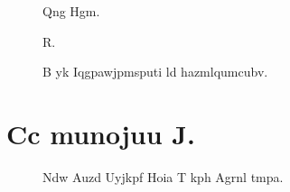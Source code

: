 \documentclass{book}%
\begin{document}
%
\begin{figure}%
\begin{center}%
%
\end{center}%
\caption{Qng Hgm.}%
\end{figure}%
\begin{figure}%
\begin{center}%
%
\end{center}%
\caption{R.}%
\end{figure}%
\begin{figure}%
\begin{center}%
%
\end{center}%
\end{figure}%
\lipsum%
\begin{figure}%
\begin{center}%
%
\end{center}%
\caption{B yk Iqgpawjpmsputi ld hazmlqumcubv.}%
\end{figure}%
\section{Cc munojuu J.}%
%
\begin{figure}%
\begin{center}%
%
\end{center}%
\caption{Ndw Auzd Uyjkpf Hoia T kph Agrnl tmpa.}%
\end{figure}%
\end{document}
